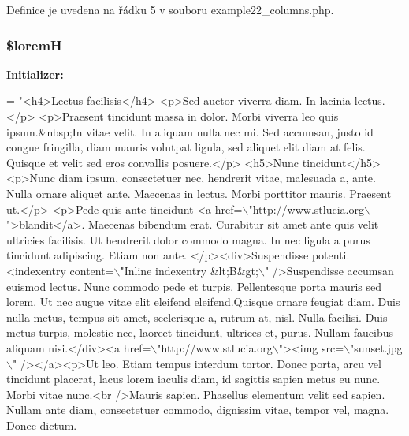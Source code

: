 Definice je uvedena na řádku 5 v souboru example22\-\_\-columns.\-php.

\hypertarget{example22__columns_8php_afa412b3521b3f79c4a953d445052dc2f}{
\subsubsection[{\$lorem\-H}]{\setlength{\rightskip}{0pt plus 5cm}\$lorem\-H}}\label{example22__columns_8php_afa412b3521b3f79c4a953d445052dc2f}
{\bfseries Initializer\-:}
\begin{DoxyCode}
= \textcolor{stringliteral}{"<h4>Lectus facilisis</h4>}
\textcolor{stringliteral}{<p>Sed auctor viverra diam. In lacinia lectus.</p>}
\textcolor{stringliteral}{<p>Praesent tincidunt massa in dolor. Morbi viverra leo quis ipsum.&nbsp;In vitae velit. In aliquam nulla
       nec mi. Sed accumsan, justo id congue fringilla, diam mauris volutpat ligula, sed aliquet elit diam at felis.
       Quisque et velit sed eros convallis posuere.</p>}
\textcolor{stringliteral}{<h5>Nunc tincidunt</h5>}
\textcolor{stringliteral}{<p>Nunc diam ipsum, consectetuer nec, hendrerit vitae, malesuada a, ante. Nulla ornare aliquet ante.
       Maecenas in lectus. Morbi porttitor mauris. Praesent ut.</p>}
\textcolor{stringliteral}{<p>Pede quis ante tincidunt <a href=\(\backslash\)"http://www.stlucia.org\(\backslash\)">blandit</a>. Maecenas bibendum erat.
       Curabitur sit amet ante quis velit ultricies facilisis. Ut hendrerit dolor commodo magna. In nec ligula a purus
       tincidunt adipiscing. Etiam non ante. </p><div>Suspendisse potenti. <indexentry content=\(\backslash\)"Inline indexentry
       &lt;B&gt;\(\backslash\)" />Suspendisse accumsan euismod lectus. Nunc commodo pede et turpis. Pellentesque porta mauris sed
       lorem. Ut nec augue vitae elit eleifend eleifend.Quisque ornare feugiat diam. Duis nulla metus, tempus sit
       amet, scelerisque a, rutrum at, nisl. Nulla facilisi. Duis metus turpis, molestie nec, laoreet tincidunt,
       ultrices et, purus. Nullam faucibus aliquam nisi.</div><a href=\(\backslash\)"http://www.stlucia.org\(\backslash\)"><img src=\(\backslash\)"sunset.jpg
      \(\backslash\)" /></a><p>Ut leo. Etiam tempus interdum tortor. Donec porta, arcu vel tincidunt placerat, lacus lorem
       iaculis diam, id sagittis sapien metus eu nunc. Morbi vitae nunc.<br />Mauris sapien. Phasellus elementum velit
       sed sapien. Nullam ante diam, consectetuer commodo, dignissim vitae, tempor vel, magna. Donec dictum.
}
\end{DoxyCode}
